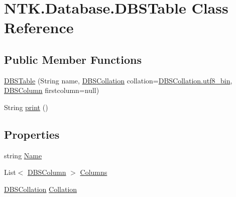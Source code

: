 \hypertarget{class_n_t_k_1_1_database_1_1_d_b_s_table}{}\section{N\+T\+K.\+Database.\+D\+B\+S\+Table Class Reference}
\label{class_n_t_k_1_1_database_1_1_d_b_s_table}
\subsection*{Public Member Functions}
\begin{DoxyCompactItemize}
\item 
\mbox{\hyperlink{class_n_t_k_1_1_database_1_1_d_b_s_table_ad835c6390e9f69dfe446eb7485f77b36}{D\+B\+S\+Table}} (String name, \mbox{\hyperlink{namespace_n_t_k_1_1_database_aa31c221c4926a0f02117557ca9883c03}{D\+B\+S\+Collation}} collation=\mbox{\hyperlink{namespace_n_t_k_1_1_database_aa31c221c4926a0f02117557ca9883c03a4fad0ebc37542e51064c07c063f2abc2}{D\+B\+S\+Collation.\+utf8\+\_\+bin}}, \mbox{\hyperlink{class_n_t_k_1_1_database_1_1_d_b_s_column}{D\+B\+S\+Column}} firstcolumn=null)
\item 
String \mbox{\hyperlink{class_n_t_k_1_1_database_1_1_d_b_s_table_a9bda08190c6cc7146481f81ac781410e}{print}} ()
\end{DoxyCompactItemize}
\subsection*{Properties}
\begin{DoxyCompactItemize}
\item 
string \mbox{\hyperlink{class_n_t_k_1_1_database_1_1_d_b_s_table_acb883634047ff270db786cf12c02b3f4}{Name}}
\item 
List$<$ \mbox{\hyperlink{class_n_t_k_1_1_database_1_1_d_b_s_column}{D\+B\+S\+Column}} $>$ \mbox{\hyperlink{class_n_t_k_1_1_database_1_1_d_b_s_table_ae69b35e58b0cc99a39c8ef79b9eb43ed}{Columns}}
\item 
\mbox{\hyperlink{namespace_n_t_k_1_1_database_aa31c221c4926a0f02117557ca9883c03}{D\+B\+S\+Collation}} \mbox{\hyperlink{class_n_t_k_1_1_database_1_1_d_b_s_table_af946255dbc32b333d4f32720e048a424}{Collation}}
\end{DoxyCompactItemize}


